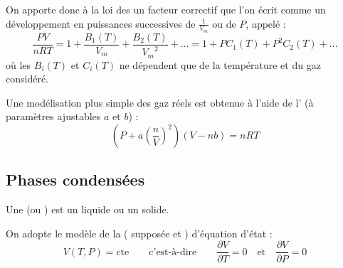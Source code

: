 \begin{definition}
On apporte donc à la loi des  un facteur correctif que l'on écrit comme un développement en puissances successives de $\frac{1}{V_m}$ ou de $P$, appelé  :
\[\frac{PV}{nRT} = 1 + \frac{B_1(T)}{V_m} + \frac{B_2(T)}{{V_m}^2} + \ldots = 1 + P C_1(T) + P^2 C_2(T) + \ldots\]
où les $B_i(T)$ et $C_i(T)$ ne dépendent que de la température et du gaz considéré.
\end{definition}

\begin{definition}
Une modélisation plus simple des gaz réels est obtenue à l'aide de l' (à paramètres ajustables $a$ et $b$) :
\[\left(P + a \left(\frac{n}{V}\right)^2\right)(V - nb) = nRT\]
\end{definition}



\subsection{Phases condensées}

\begin{definition}
Une  (ou ) est un liquide ou un solide.
\end{definition}

\begin{definition}
On adopte le modèle de la  ( supposée  et ) d'équation d'état :
\[V(T, P) = \text{cte} \qquad \text{c'est-à-dire} \qquad \frac{\partial V}{\partial T} = 0 \quad \text{et} \quad \frac{\partial V}{\partial P} = 0\]
\end{definition}
